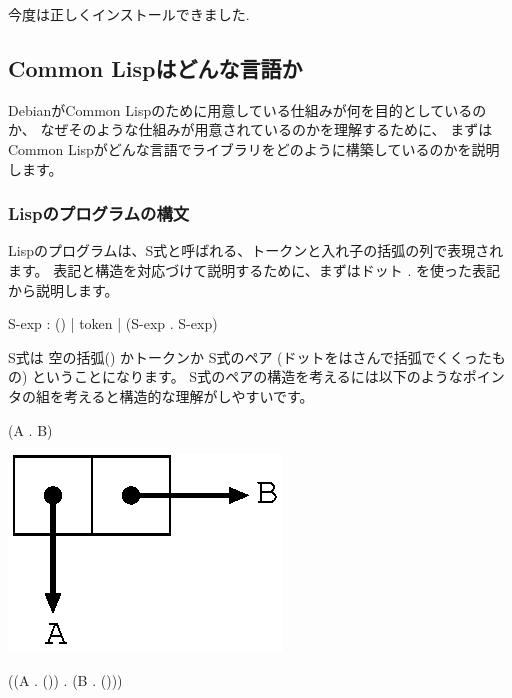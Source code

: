 \documentclass[mingoth,a4paper]{jsarticle}
\begin{document}
今度は正しくインストールできました.


\subsection{Common Lispはどんな言語か}

DebianがCommon Lispのために用意している仕組みが何を目的としているのか、
なぜそのような仕組みが用意されているのかを理解するために、
まずはCommon Lispがどんな言語でライブラリをどのように構築しているのかを説明します。

\subsubsection{Lispのプログラムの構文}

Lispのプログラムは、S式と呼ばれる、トークンと入れ子の括弧の列で表現されます。
表記と構造を対応づけて説明するために、まずはドット . を使った表記から説明します。

\begin{commandline}
 S-exp  : () | token | (S-exp . S-exp)
\end{commandline}

S式は 空の括弧() かトークンか S式のペア (ドットをはさんで括弧でくくったもの) ということになります。
S式のペアの構造を考えるには以下のようなポインタの組を考えると構造的な理解がしやすいです。

\begin{commandline}
 (A . B)
\end{commandline}

\includegraphics[scale=0.5]{image200903/abpair.eps}

\begin{commandline}
((A . ()) . (B . ()))
\end{commandline}
\end{document}
